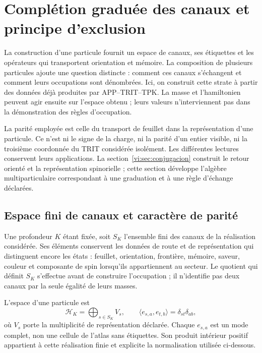 \section{Complétion graduée des canaux et principe d’exclusion}
\label{vi:sec:fock-pauli}

La construction d’une particule fournit un espace de canaux, ses
étiquettes et les opérateurs qui transportent orientation et mémoire. La
composition de plusieurs particules ajoute une question distincte : comment
ces canaux s’échangent et comment leurs occupations sont dénombrées. Ici,
on construit cette strate à partir des données déjà produites par
APP--TRIT--TPK. La masse et l’hamiltonien peuvent agir ensuite sur
l’espace obtenu ; leurs valeurs n’interviennent pas dans la démonstration des
règles d’occupation.

La parité employée est celle du transport de feuillet dans la représentation
d’une particule. Ce n’est ni le signe de la charge, ni la parité d’un entier
visible, ni la troisième coordonnée du TRIT considérée isolément.
Les différentes lectures conservent leurs applications. La
section~\ref{vi:sec:conjugacion} construit le retour orienté et la
représentation spinorielle ; cette section développe l’algèbre
multiparticulaire correspondant à une graduation et à une règle
d’échange déclarées.

\subsection{Espace fini de canaux et caractère de parité}
\label{vi:subsec:canales-graduados}

Une profondeur \(K\) étant fixée, soit \(S_K\) l’ensemble fini des
canaux de la réalisation considérée. Ses éléments conservent les
données de route et de représentation qui distinguent encore les états :
feuillet, orientation, frontière, mémoire, saveur, couleur et composante de
spin lorsqu’ils appartiennent au secteur. Le quotient qui définit \(S_K\)
s’effectue avant de construire l’occupation ; il n’identifie pas deux canaux
par la seule égalité de leurs masses.

L’espace d’une particule est
\begin{equation}
 \mathcal H_K=\bigoplus_{s\in S_K}V_s,
 \qquad\langle e_{s,a},e_{t,b}\rangle=\delta_{st}\delta_{ab},
 \label{vi:eq:espacio-canales-fock}
\end{equation}
où \(V_s\) porte la multiplicité de représentation déclarée.
Chaque \(e_{s,a}\) est un mode complet, non une cellule de l’atlas sans
étiquettes. Son produit intérieur positif appartient à cette réalisation
finie et explicite la normalisation utilisée ci-dessous.

